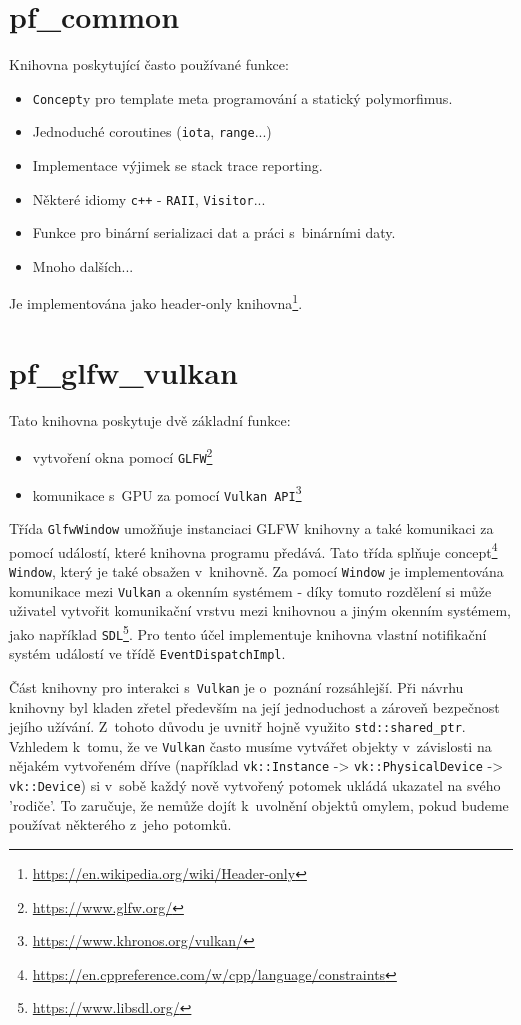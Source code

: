 \section{pf\_common}
Knihovna poskytující často používané funkce:
\begin{itemize}
	\item \texttt{Concept}y pro template meta programování a statický polymorfimus.
	\item Jednoduché coroutines (\texttt{iota}, \texttt{range}...)
	\item Implementace výjimek se stack trace reporting.
	\item Některé idiomy \texttt{c++} - \texttt{RAII}, \texttt{Visitor}...
	\item Funkce pro binární serializaci dat a práci s~binárními daty.
	\item Mnoho dalších...
\end{itemize}

Je implementována jako header-only knihovna\footnote{\url{https://en.wikipedia.org/wiki/Header-only}}.

\section{pf\_glfw\_vulkan}
Tato knihovna poskytuje dvě základní funkce:
\begin{itemize}
	\item vytvoření okna pomocí \texttt{GLFW}\footnote{\url{https://www.glfw.org/}}
	\item komunikace s~GPU za pomocí \texttt{Vulkan API}\footnote{\url{https://www.khronos.org/vulkan/}}
\end{itemize}

Třída \texttt{GlfwWindow} umožňuje instanciaci GLFW knihovny a také komunikaci za pomocí událostí, které knihovna programu předává. Tato třída splňuje concept\footnote{\url{https://en.cppreference.com/w/cpp/language/constraints}} \texttt{Window}, který je také obsažen v~knihovně. Za pomocí \texttt{Window} je implementována komunikace mezi \texttt{Vulkan} a okenním systémem - díky tomuto rozdělení si může uživatel vytvořit komunikační vrstvu mezi knihovnou a jiným okenním systémem, jako například \texttt{SDL}\footnote{\url{https://www.libsdl.org/}}. Pro tento účel implementuje knihovna vlastní notifikační systém událostí ve třídě \texttt{EventDispatchImpl}.

Část knihovny pro interakci s~\texttt{Vulkan} je o~poznání rozsáhlejší. Při návrhu knihovny byl kladen zřetel především na její jednoduchost a zároveň bezpečnost jejího užívání. Z~tohoto důvodu je uvnitř hojně využito \texttt{std::shared\_ptr}. Vzhledem k~tomu, že ve \texttt{Vulkan} často musíme vytvářet objekty v~závislosti na nějakém vytvořeném dříve (například \texttt{vk::Instance} -> \texttt{vk::PhysicalDevice} -> \texttt{vk::Device}) si v~sobě každý nově vytvořený potomek ukládá ukazatel na svého 'rodiče'. To zaručuje, že nemůže dojít k~uvolnění objektů omylem, pokud budeme používat některého z~jeho potomků.

